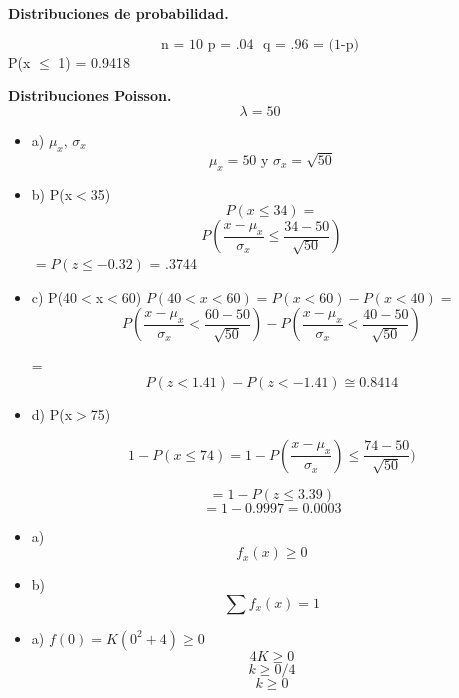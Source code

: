 \documentclass{../oxmathproblems}
\begin{document}
\begin{questions}

\miquestion\textbf {Distribuciones de probabilidad.}

$$ \text {n = 10 } 
\text {p = .04 }
\text { q = .96 = (1-p)} 
$$
P(x $\leq$ 1) = 0.9418



\miquestion\textbf{Distribuciones Poisson. }
$$ \lambda = 50 $$  
\begin{itemize}
\item a) $\mu_x$, $\sigma_x$
$$ \mu_x = 50 \text{ y } \sigma_x = \sqrt{50} $$

\item  b) P(x$<$35)
$$ 
P(x \leq 34)  = $$  
$$ P( \frac{x - \mu_x}{\sigma_x}  \leq \frac{34-50}{\sqrt{50}})  
$$ 
 $ = P(z \leq - 0.32) $  = .3744  %
 
 
 
\item  c) P(40$<$x$<$60) 
$  P (40 < x < 60) = P(x < 60) - P(x < 40) = $  
$$ P(\frac{x - \mu_x}{\sigma_x} < \frac{60-50}{\sqrt{50}}) - P(\frac{x - \mu_x}{\sigma_x} < \frac{40-50}{\sqrt{50}}) $$

=$$ P(z < 1.41) - P(z < - 1.41) \cong 0.8414 $$  %


\item  d) P(x$>$75)

$$ 1- P( x \leq 74) = 1- P(\frac{x - \mu_x}{\sigma_x}) \leq \frac{74-50}{\sqrt{50}})$$

$$= 1- P(z \leq 3.39) $$
$$= 1 - 0.9997  = 0.0003$$  %
\end{itemize}

\miquestion 

\begin{itemize}
\item a) $$ f_x (x) \geq 0 $$ 
\item  b) $$ \sum f_x (x) = 1 $$
\end{itemize}


\begin{itemize}
\item a) $f(0) = K(0^2 + 4) \geq 0 $
$$ 4K \geq 0 $$
 $$ k \geq 0/ 4$$
$$ k \geq 0 $$


\end{itemize}
\end{questions}
\end{document}
